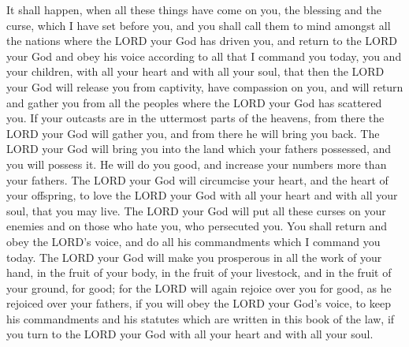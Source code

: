  It shall happen, when all these things have come on you,
the blessing and the curse, which I have set before you, and you shall
call them to mind amongst all the nations where the LORD your God has
driven you,  and return to the LORD your God and obey his
voice according to all that I command you today, you and your children,
with all your heart and with all your soul,  that then the
LORD your God will release you from captivity, have compassion on you,
and will return and gather you from all the peoples where the LORD your
God has scattered you.  If your outcasts are in the
uttermost parts of the heavens, from there the LORD your God will gather
you, and from there he will bring you back.  The LORD your
God will bring you into the land which your fathers possessed, and you
will possess it. He will do you good, and increase your numbers more
than your fathers.  The LORD your God will circumcise your
heart, and the heart of your offspring, to love the LORD your God with
all your heart and with all your soul, that you may live. 
The LORD your God will put all these curses on your enemies and on those
who hate you, who persecuted you.  You shall return and
obey the LORD's voice, and do all his commandments which I command you
today.  The LORD your God will make you prosperous in all
the work of your hand, in the fruit of your body, in the fruit of your
livestock, and in the fruit of your ground, for good; for the LORD will
again rejoice over you for good, as he rejoiced over your fathers,
 if you will obey the LORD your God's voice, to keep his
commandments and his statutes which are written in this book of the law,
if you turn to the LORD your God with all your heart and with all your
soul.

